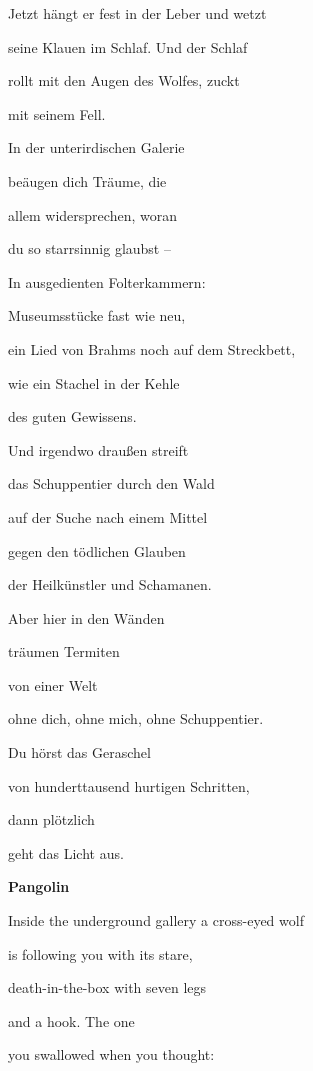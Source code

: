 Jetzt hängt er fest in der Leber und wetzt

seine Klauen im Schlaf. Und der Schlaf 

rollt mit den Augen des Wolfes, zuckt 

mit seinem Fell.


\bigskip

In der unterirdischen Galerie 

beäugen dich Träume, die 

allem widersprechen, woran 

du so starrsinnig glaubst -- 

In ausgedienten Folterkammern:

Museumsstücke fast wie neu,

ein Lied von Brahms noch auf dem Streckbett,

wie ein Stachel in der Kehle

des guten Gewissens.


\bigskip

Und irgendwo draußen streift 

das Schuppentier durch den Wald

auf der Suche nach einem Mittel 

gegen den tödlichen Glauben 

der Heilkünstler und Schamanen.


\bigskip

Aber hier in den Wänden

träumen Termiten 

von einer Welt

ohne dich, ohne mich, ohne Schuppentier.


\bigskip

Du hörst das Geraschel

von hunderttausend hurtigen Schritten, 

dann plötzlich 

geht das Licht aus.


\bigskip

\clearpage
\bigskip

{\bfseries
Pangolin}


\bigskip

Inside the underground gallery a cross-eyed wolf

is following you with its stare,

death-in-the-box with seven legs

and a hook. The one 

you swallowed when you thought:

